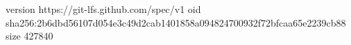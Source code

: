 version https://git-lfs.github.com/spec/v1
oid sha256:2b6dbd56107d054e3c49d2cab1401858a094824700932f72bfcaa65e2239cb88
size 427840
